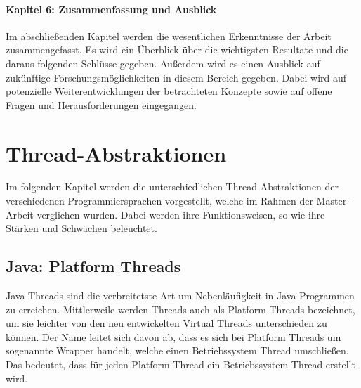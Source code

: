 \documentclass[fontsize=12pt,paper=a4,twoside=semi,parskip=half-,headsepline,headinclude]{scrreprt}
\begin{document}
\subsubsection{Kapitel 6: Zusammenfassung und Ausblick}

Im abschließenden Kapitel werden die wesentlichen Erkenntnisse der Arbeit zusammengefasst. Es wird ein Überblick über die wichtigsten Resultate und die daraus folgenden Schlüsse gegeben. Außerdem wird es einen Ausblick auf zukünftige Forschungsmöglichkeiten in diesem Bereich gegeben. Dabei wird auf potenzielle Weiterentwicklungen der betrachteten Konzepte sowie auf offene Fragen und Herausforderungen eingegangen.

\chapter{Thread-Abstraktionen}

Im folgenden Kapitel werden die unterschiedlichen Thread-Abstraktionen der verschiedenen Programmiersprachen vorgestellt, welche im Rahmen der Master-Arbeit verglichen wurden. Dabei werden ihre Funktionsweisen, so wie ihre Stärken und Schwächen beleuchtet.

\section{Java: Platform Threads}

Java Threads sind die verbreitetste Art um Nebenläufigkeit in Java-Programmen zu erreichen. Mittlerweile werden Threads auch als Platform Threads bezeichnet, um sie leichter von den neu entwickelten Virtual Threads unterschieden zu können. Der Name leitet sich davon ab, dass es sich bei Platform Threads um sogenannte Wrapper handelt, welche einen Betriebssystem Thread umschließen. Das bedeutet, dass für jeden Platform Thread ein Betriebssystem Thread erstellt wird.
\end{document}
